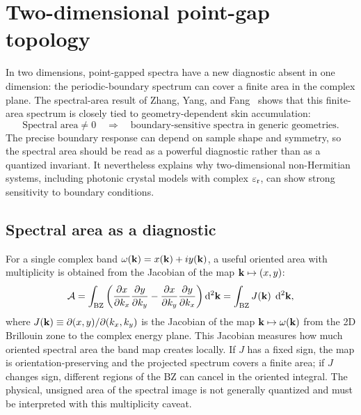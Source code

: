 \section{Two-dimensional point-gap topology}
\label{sec:2d-point-gap}

In two dimensions, point-gapped spectra have a new diagnostic absent in
one dimension: the periodic-boundary spectrum can cover a finite area in
the complex plane. The spectral-area result of Zhang, Yang, and
Fang~\cite{zhang2022universal} shows that this finite-area spectrum is
closely tied to geometry-dependent skin accumulation:
\begin{equation}
 \text{Spectral area} \neq 0
 \quad\Longrightarrow\quad
 \text{boundary-sensitive spectra in generic geometries}.
 \label{eq:spectral-area}
\end{equation}
The precise boundary response can depend on sample shape and symmetry,
so the spectral area should be read as a powerful diagnostic rather than
as a quantized invariant. It nevertheless explains why two-dimensional
non-Hermitian systems, including photonic crystal models with complex
$\varepsilon_{\mathrm{r}}$, can show strong sensitivity to boundary conditions.

\subsection{Spectral area as a diagnostic}
\label{ssec:spectral-area-invariant}

For a single complex band $\omega(\mathbf{k})=x(\mathbf{k})+iy(\mathbf{k})$, a useful
oriented area with multiplicity is obtained from the Jacobian of the map
$\mathbf{k}\mapsto (x,y)$:
\begin{equation}
 \mathcal{A} = \int_{\mathrm{BZ}}
 \left(\frac{\partial x}{\partial k_x}\frac{\partial y}{\partial k_y}
 - \frac{\partial x}{\partial k_y}\frac{\partial y}{\partial k_x}\right)
 \mathop{}\!\mathrm{d}^2\mathbf{k}
 = \int_{\mathrm{BZ}} J(\mathbf{k})\;\mathop{}\!\mathrm{d}^2\mathbf{k},
 \label{eq:spectral-area-jacobian}
\end{equation}
where $J(\mathbf{k}) \equiv \partial(x, y)/\partial(k_x, k_y)$ is the
Jacobian of the map $\mathbf{k} \mapsto \omega(\mathbf{k})$ from the 2D Brillouin
zone to the complex energy plane. This Jacobian measures how much
oriented spectral area the band map creates locally. If $J$ has a fixed
sign, the map is orientation-preserving and the projected spectrum
covers a finite area; if $J$ changes sign, different regions of the BZ
can cancel in the oriented integral. The physical, unsigned area of the
spectral image is not generally quantized and must be interpreted with
this multiplicity caveat.

